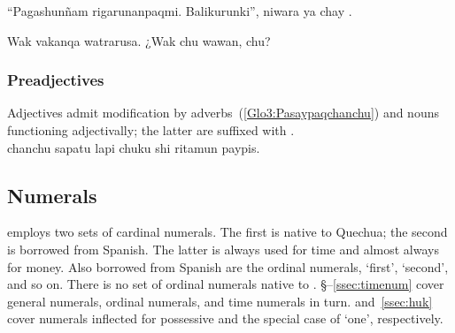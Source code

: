 %
{“Pagashunñam rigarunanpaqmi. Balikurunki”, niwara ya chay  .}%
{}%
{}{}%

%
{Wak vakanqa watrarusa. ¿Wak chu wawan, chu?}%
{}%
{}{}%

\subsubsection{Preadjectives}\label{ssec:preadj}
Adjectives admit modification by adverbs~(\ref{Glo3:Pasaypaqchanchu}) and nouns functioning adjectivally; the latter are suffixed with .\\

%
{ chanchu sapatu  lapi chuku shi ritamun paypis.}%
{}%
{}{}%

\subsection{Numerals}\label{sec:numerals}
\SYQ{} employs two sets of cardinal numerals. The first is native to Quechua; the second is borrowed from Spanish. The latter is always used for time and almost always for money. Also borrowed from Spanish are the ordinal numerals,  ‘first’,  ‘second’, and so on. There is no set of ordinal numerals native to \SYQ. §--\ref{ssec:timenum} cover general numerals, ordinal numerals, and time numerals in turn.  and~\ref{ssec:huk} cover numerals inflected for possessive and the special case of  ‘one’, respectively.

